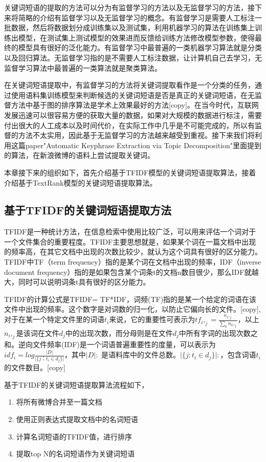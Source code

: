 \documentclass[master]{njuthesis}
\begin{document}
    关键词短语的提取的方法可以分为有监督学习的方法以及无监督学习的方法，接下来将简略的介绍有监督学习以及无监督学习的概念。有监督学习是需要人工标注一批数据，然后将数据划分成训练集以及测试集，利用机器学习的算法在训练集上训练出模型，在测试集上测试模型的效果进而反馈给训练方法修改模型参数，使得最终的模型具有很好的泛化能力。有监督学习中最普遍的一类机器学习算法就是分类以及回归算法。无监督学习指的是不需要人工标注数据，让计算机自己去学习，无监督学习算法中最普遍的一类算法就是聚类算法。
    
    在关键词短语提取中，有监督学习的方法将关键词提取看作是一个分类的任务，通过使用语料集训练模型来判断候选的关键词短语是否是真正的关键词短语，在无监督方法中基于图的排序算法是学术上效果最好的方法[copy]。在当今时代，互联网发展迅速可以很容易方便的获取大量的数据，如果对大规模的数据进行标注，需要付出很大的人工成本以及时间代价，在实际工作中几乎是不可能完成的，所以有监督的方法不太实用，因此基于无监督学习的方法越来越受到重视。接下来我们将利用这篇paper"Automatic Keyphrase Extraction via Topic Decomposition"里面提到的算法，在新浪微博的语料上尝试提取关键词。
    
    本章接下来的组织如下，首先介绍基于TFIDF模型的关键词短语提取算法，接着介绍基于TextRank模型的关键词短语提取算法。

\subsection{基于TFIDF的关键词短语提取方法}

    TFIDF是一种统计方法，在信息检索中使用比较广泛，可以用来评估一个词对于一个文件集合的重要程度。TFIDF主要思想就是，如果某个词在一篇文档中出现的频率高，在其它文档中出现的次数比较少，就认为这个词具有很好的区分能力。TFIDF中TF（term frequency）指的是某个词在文档中出现的频率，IDF（inverse document frequency）指的是如果包含某个词条t的文档n数目很少，那么IDF就越大，同时可以说明词条t具有很好的区分能力。

    TFIDF的计算公式是TFIDF= TF*IDF，词频(TF)指的是某一个给定的词语在该文件中出现的频率。这个数字是对词数的归一化，以防止它偏向长的文件。[copy],对于在某一个特定文件里的词语$t_i$来说，它的重要性可表示为$tf_i,_j = \frac{n_i,_j}{\sum_{k} n_k,_j}$，以上$n_i,_j$是该词在文件$d_j$中的出现次数，而分母则是在文件$d_j$中所有字词的出现次数之和。逆向文件频率(IDF)是一个词语普遍重要性的度量，可以表示为$idf_i = log\frac{\vert D \vert}{\vert \{j：t_i \in d_j \}\vert}$，其中$\vert D \vert:$ 是语料库中的文件总数。$\vert\{ j : t_i \in d_j\}\vert:$，包含词语$t_i$的文件数目。[copy]
    
    基于TFIDF的关键词短语提取算法流程如下，
    \begin{enumerate}
      \item 将所有微博合并至一篇文档
      \item 使用正则表达式提取文档中的名词短语
      \item 计算名词短语的TFIDF值，进行排序
      \item 提取top N的名词短语作为关键词短语
    \end{enumerate}
      
\end{document}

